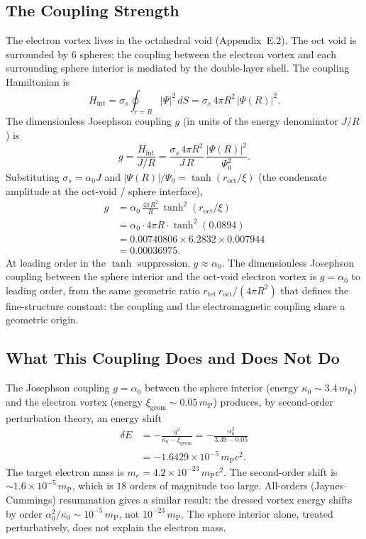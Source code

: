 \documentclass[aps,prl,preprint,superscriptaddress,floatfix]{revtex4-2}
\newcommand{\roct}{r_{\mathrm{oct}}}
\newcommand{\rtet}{r_{\mathrm{tet}}}
\newcommand{\az}{\alpha_0}
\newcommand{\mP}{m_{\mathrm{P}}}
\newcommand{\Rsph}{R}
\begin{document}
\subsection{The Coupling Strength}

The electron vortex lives in the octahedral void (Appendix~E.2). The oct void is
surrounded by $6$ spheres; the coupling between the electron vortex and each
surrounding sphere interior is mediated by the double-layer shell. The coupling
Hamiltonian is
\begin{equation}
  H_{\mathrm{int}} = \sigma_s \oint_{r=\Rsph}|\Psi|^2\,dS
  = \sigma_s\,4\pi \Rsph^2\,|\Psi(\Rsph)|^2 .
\end{equation}
The dimensionless Josephson coupling $g$ (in units of the energy denominator
$J/\Rsph$) is
\begin{equation}
  g = \frac{H_{\mathrm{int}}}{J/\Rsph}
  = \frac{\sigma_s\,4\pi \Rsph^2}{J\,\Rsph}\,
    \frac{|\Psi(\Rsph)|^2}{\Psi_0^2}.
\end{equation}
Substituting $\sigma_s=\az J$ and $|\Psi(\Rsph)|/\Psi_0 = \tanh(\roct/\xi)$ (the
condensate amplitude at the oct-void / sphere interface),
\begin{align}
  g &= \az\,\frac{4\pi \Rsph^2}{\Rsph}\,\tanh^2(\roct/\xi) \nonumber\\
    &= \az \cdot 4\pi \Rsph \cdot \tanh^2(0.0894) \nonumber\\
    &= 0.00740806 \times 6.2832 \times 0.007944 \nonumber\\
    &= 0.00036975 .
\end{align}
At leading order in the $\tanh$ suppression, $g \approx \az$. The dimensionless
Josephson coupling between the sphere interior and the oct-void electron vortex
is $g=\az$ to leading order, from the same geometric ratio
$\rtet\,\roct/(4\pi \Rsph^2)$ that defines the fine-structure constant: the
coupling and the electromagnetic coupling share a geometric origin.

\subsection{What This Coupling Does and Does Not Do}

The Josephson coupling $g=\az$ between the sphere interior (energy
$\kappa_0\sim 3.4\,\mP$) and the electron vortex (energy
$\xi_{\mathrm{geom}}\sim 0.05\,\mP$) produces, by second-order perturbation
theory, an energy shift
\begin{align}
  \delta E &= -\frac{g^2}{\kappa_0-\xi_{\mathrm{geom}}}
  = -\frac{\az^2}{3.39-0.05} \nonumber\\
  &= -1.6429\times10^{-5}\,\mP c^2 .
\end{align}
The target electron mass is $m_e = 4.2\times10^{-23}\,\mP c^2$. The second-order
shift is $\sim 1.6\times10^{-5}\,\mP$, which is $18$ orders of magnitude too
large. All-orders (Jaynes--Cummings) resummation gives a similar result: the
dressed vortex energy shifts by order $\az^2/\kappa_0 \sim 10^{-5}\,\mP$, not
$10^{-23}\,\mP$. The sphere interior alone, treated perturbatively, does not
explain the electron mass.
\end{document}
